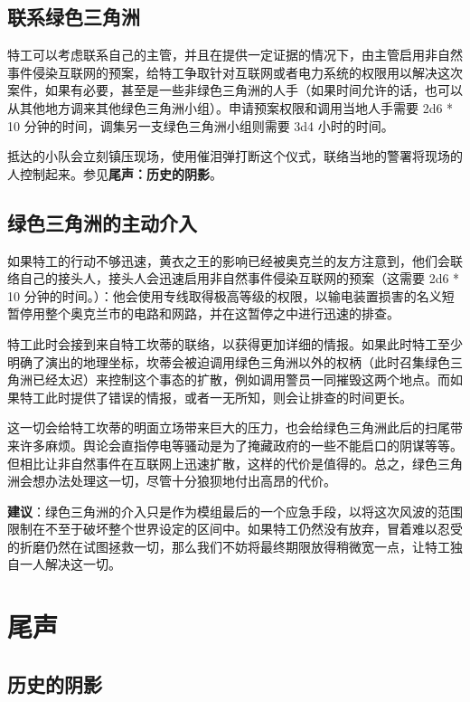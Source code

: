 \subsection{联系绿色三角洲}

特工可以考虑联系自己的主管，并且在提供一定证据的情况下，由主管启用非自然事件侵染互联网的预案，给特工争取针对互联网或者电力系统的权限用以解决这次案件，如果有必要，甚至是一些非绿色三角洲的人手（如果时间允许的话，也可以从其他地方调来其他绿色三角洲小组）。申请预案权限和调用当地人手需要 2d6 * 10 分钟的时间，调集另一支绿色三角洲小组则需要 3d4 小时的时间。

抵达的小队会立刻镇压现场，使用催泪弹打断这个仪式，联络当地的警署将现场的人控制起来。参见\textbf{尾声：历史的阴影}。

\subsection{绿色三角洲的主动介入}

如果特工的行动不够迅速，黄衣之王的影响已经被奥克兰的友方注意到，他们会联络自己的接头人，接头人会迅速启用非自然事件侵染互联网的预案（这需要 2d6 * 10 分钟的时间。）：他会使用专线取得极高等级的权限，以输电装置损害的名义短暂停用整个奥克兰市的电路和网路，并在这暂停之中进行迅速的排查。

特工此时会接到来自特工坎蒂的联络，以获得更加详细的情报。如果此时特工至少明确了演出的地理坐标，坎蒂会被迫调用绿色三角洲以外的权柄（此时召集绿色三角洲已经太迟）来控制这个事态的扩散，例如调用警员一同摧毁这两个地点。而如果特工此时提供了错误的情报，或者一无所知，则会让排查的时间更长。

这一切会给特工坎蒂的明面立场带来巨大的压力，也会给绿色三角洲此后的扫尾带来许多麻烦。舆论会直指停电等骚动是为了掩藏政府的一些不能启口的阴谋等等。但相比让非自然事件在互联网上迅速扩散，这样的代价是值得的。总之，绿色三角洲会想办法处理这一切，尽管十分狼狈地付出高昂的代价。

\textbf{建议}：绿色三角洲的介入只是作为模组最后的一个应急手段，以将这次风波的范围限制在不至于破坏整个世界设定的区间中。如果特工仍然没有放弃，冒着难以忍受的折磨仍然在试图拯救一切，那么我们不妨将最终期限放得稍微宽一点，让特工独自一人解决这一切。

\section{尾声}

\subsection{历史的阴影}

